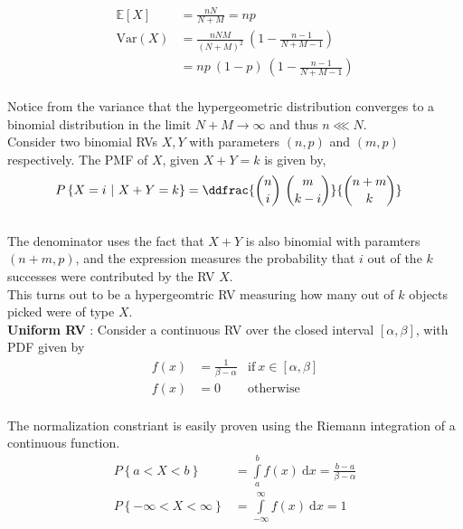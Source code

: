 \begin{align}
	\mathbb{E}[X] &= \frac{nN}{N+M} = np \\[1ex]
	\mathrm{Var}(X) &= \frac{nNM}{(N+M)^2}\ \left(1 - \frac{n-1}{N+M-1}\right) \nonumber \\[1ex]
	&=  np\ (1-p)\ \left(1 - \frac{n-1}{N+M-1}\right)
\end{align}\\

Notice from the variance that the hypergeometric distribution converges to a binomial distribution in the limit $ N+M \to \infty $ and thus $ n \lll N $.\\

Consider two binomial RVs $ X, Y $ with parameters $ (n, p) $ and $ (m, p) $ respectively. The PMF of $ X $, given $ X+Y = k $ is given by, \\

\begin{align}
	P \left\{X = i\ |\ X+Y = k\right\} &= \ddfrac{\binom{n}{i}\ \binom{m}{k-i}}{\binom{n+m}{k}}
\end{align} \\

The denominator uses the fact that $ X+Y $ is also binomial with paramters $ (n+m, p) $, and the expression measures the probability that $ i $ out of the $ k $ successes were contributed by the RV $ X $. \\

This turns out to be a hypergeomtric RV measuring how many out of $ k $ objects picked were of type $ X $. \\


\textbf{Uniform RV} : Consider a continuous RV over the closed interval $ \left[\alpha, \beta\right] $, with PDF given by \\

\begin{align}
	f(x) &= \frac{1}{\beta - \alpha} & \text{if}\ x \in \left[\alpha, \beta\right] \\[1ex]
	f(x) &= 0 & \text{otherwise} \nonumber
\end{align}\\

The normalization constriant is easily proven using the Riemann integration of a continuous function.\\

\begin{align}
	P \left\{a < X < b\right\} &= \int\limits_{a}^{b} f(x)\ \mathrm{d} x = \frac{b - a}{\beta - \alpha} \\[1ex]
	P \left\{-\infty < X < \infty\right\} &= \int\limits_{-\infty}^{\infty} f(x)\ \mathrm{d} x = 1 \nonumber
\end{align}\\

